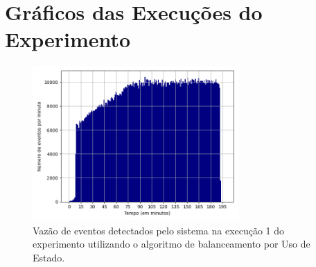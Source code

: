 \chapter{Gráficos das Execuções do Experimento}
\label{ape:graphics}





\begin{figure}[h]
\centering
\includegraphics[width=0.7\textwidth]{figuras/graphics/histogram_vazao_5-dez-su.png}
\caption{Vazão de eventos detectados pelo sistema na execução 1 do experimento utilizando o algoritmo de balanceamento por Uso de Estado.}
\label{fig:vazao_5-dez-su}
\end{figure}



